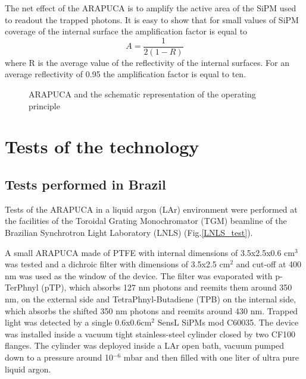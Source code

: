 The net effect of the ARAPUCA is to amplify the active area of the SiPM used to readout the trapped photons. It is easy to show that for small values of SiPM coverage of the internal surface the amplification factor is equal to
\begin{equation}
A=\frac{1}{2(1-R)}
\end{equation}
where R is the average value of the reflectivity of the internal surfaces. For an average reflectivity of 0.95 the amplification factor is equal to ten.

\begin{figure}[ht]
\begin{center}
	\caption{ARAPUCA and the schematic representation of the operating principle} 
    \label{arapuca}
\end{center}
\end{figure}

\section{Tests of the technology}\label{testsec}

\subsection{Tests performed in Brazil}
\label{subsec:testlnls}
Tests of the ARAPUCA in a liquid argon (LAr) environment were performed at the facilities of the Toroidal Grating Monochromator (TGM) beamline of the Brazilian Synchrotron Light Laboratory (LNLS) (Fig.\ref{LNLS_test}). 

A small ARAPUCA made of PTFE with internal dimensions of 3.5x2.5x0.6 cm$^3$ was tested and a dichroic filter with dimensions of 3.5x2.5 cm$^2$ and cut-off at 400 nm was used as the window of the device.
The filter was evaporated with p-TerPhnyl (pTP), which absorbs 127 nm photons and reemits them around 350 nm,  on the external side and TetraPhnyl-Butadiene (TPB) on the internal side, which absorbs the shifted 350 nm photons and reemits around 430 nm. Trapped light was detected by a single 0.6x0.6cm$^2$  SensL SiPMs mod C60035.
The device was installed inside a vacuum tight stainless-steel cylinder closed by two CF100 flanges. The cylinder was deployed inside a LAr open bath, vacuum pumped down to a pressure around  10$^{-6}$ mbar and then filled with one liter of ultra pure liquid argon. 

